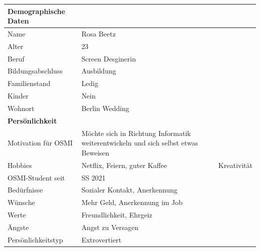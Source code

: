 \documentclass{article}
\begin{document}
\begin{center}
	\begin{tabularx}{\textwidth}{|l|X|}
		\hline
		\textbf{Demographische Daten} &                                                     \\
		\hline
		Name                          & Rosa Beetz                                          \\
		\hline
		Alter                         & 23                                                  \\
		\hline
		Beruf                         & Screen Desginerin                                   \\
		\hline
		Bildungsabschluss             & Ausbildung                                          \\
		\hline
		Familienstand                 & Ledig                                               \\
		\hline
		Kinder                        & Nein                                                \\
		\hline
		Wohnort                       & Berlin Wedding                                      \\
		\hline
		\textbf{Persönlichkeit}       &                                                     \\
		\hline
		Motivation für OSMI           & Möchte sich in Richtung Informatik weiterentwickeln
		und sich selbst etwas Beweisen                                                      \\
		\hline
		Hobbies                       & Netflix, Feiern, guter Kaffee & Kreativität         \\
		\hline
		OSMI-Student seit             & SS 2021                                             \\
		\hline
		Bedürfnisse                   & Sozialer Kontakt, Anerkennung                       \\
		\hline
		Wünsche                       & Mehr Geld, Anerkennung im Job                       \\
		\hline
		Werte                         & Freundlichkeit, Ehrgeiz                             \\
		\hline
		Ängste                        & Angst zu Versagen                                   \\
		\hline
		Persönlichkeitstyp            & Extrovertiert                                       \\
		\hline
	\end{tabularx}
\end{center}
\end{document}
